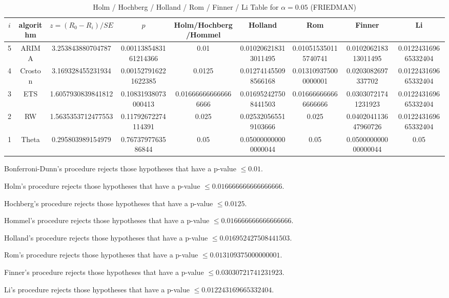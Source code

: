 \documentclass[a4paper,10pt]{article}
\begin{document}
\begin{landscape}
\begin{table}[!htp]
\centering\scriptsize
\caption{Holm / Hochberg / Holland / Rom / Finner / Li Table for $\alpha=0.05$ (FRIEDMAN)}
\begin{tabular}{ccccccccc}
$i$&algorithm&$z=(R_0 - R_i)/SE$&$p$&Holm/Hochberg/Hommel&Holland&Rom&Finner&Li\\
\hline
5&ARIMA&3.253843880704787&0.0011385483161214366&0.01&0.010206218313011495&0.010515350115740741&0.010206218313011495&0.012243169665332404\\
4&Croston&3.169328455231934&0.001527916221622385&0.0125&0.012741455098566168&0.013109375000000001&0.0203082697337702&0.012243169665332404\\
3&ETS&1.6057930839841812&0.10831938073000413&0.016666666666666666&0.016952427508441503&0.016666666666666666&0.03030721741231923&0.012243169665332404\\
2&RW&1.5635353712477553&0.11792672274114391&0.025&0.025320565519103666&0.025&0.040204113647960726&0.012243169665332404\\
1&Theta&0.295803989154979&0.7673797763586844&0.05&0.050000000000000044&0.05&0.050000000000000044&0.05\\
\hline
\end{tabular}
\end{table}
Bonferroni-Dunn's procedure rejects those hypotheses that have a p-value $\le0.01$.


Holm's procedure rejects those hypotheses that have a p-value $\le0.016666666666666666$.


Hochberg's procedure rejects those hypotheses that have a p-value $\le0.0125$.


Hommel's procedure rejects those hypotheses that have a p-value $\le0.016666666666666666$.


Holland's procedure rejects those hypotheses that have a p-value $\le0.016952427508441503$.


Rom's procedure rejects those hypotheses that have a p-value $\le0.013109375000000001$.


Finner's procedure rejects those hypotheses that have a p-value $\le0.03030721741231923$.


Li's procedure rejects those hypotheses that have a p-value $\le0.012243169665332404$.



\newpage


\end{landscape}
\end{document}
